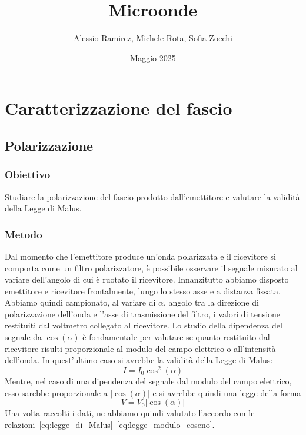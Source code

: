 \documentclass[a4paper]{article}
\title{Microonde}
\author{Alessio Ramirez, Michele Rota, Sofia Zocchi}
\date{Maggio 2025} %
\begin{document}
\maketitle
\section{Caratterizzazione del fascio}
\subsection{Polarizzazione}
\subsubsection{Obiettivo}
Studiare la polarizzazione del fascio prodotto dall'emettitore e valutare la validità della Legge di Malus.

\subsubsection{Metodo}
Dal momento che l'emettitore produce un'onda polarizzata e il ricevitore si comporta come un filtro polarizzatore, 
è possibile osservare il segnale misurato al variare dell'angolo di cui è ruotato il ricevitore.
Innanzitutto abbiamo disposto emettitore e ricevitore frontalmente, lungo lo stesso asse e a distanza fissata. 
Abbiamo quindi campionato, al variare di $\alpha$, angolo tra la direzione di polarizzazione dell'onda e l'asse di trasmissione del filtro, 
i valori di tensione restituiti dal voltmetro collegato al ricevitore. 
Lo studio della dipendenza del segnale da $\cos(\alpha)$ è fondamentale per valutare se quanto restituito dal ricevitore risulti proporzionale al modulo del campo elettrico o all'intensità dell'onda. 
In quest'ultimo caso si avrebbe la validità della Legge di Malus:
\begin{equation}
I = I_0 \cos^2(\alpha)
\label{eq:legge_di_Malus}
\end{equation}
Mentre, nel caso di una dipendenza del segnale dal modulo del campo elettrico, esso sarebbe proporzionale a $|\cos(\alpha)|$  
e si avrebbe quindi una legge della forma
\begin{equation}
V = V_0|\cos(\alpha)|
\label{eq:legge_modulo_coseno}
\end{equation}
Una volta raccolti i dati, ne abbiamo quindi valutato l'accordo con le relazioni~\eqref{eq:legge_di_Malus}~\eqref{eq:legge_modulo_coseno}.
\end{document}
